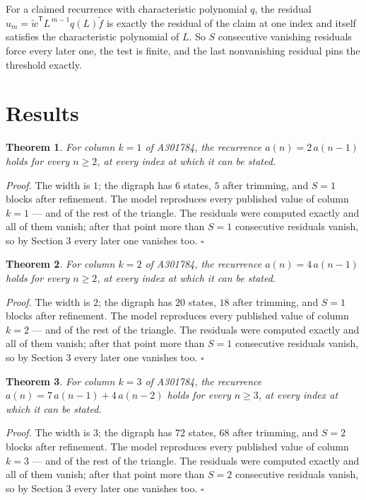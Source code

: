 \documentclass[11pt]{article}
\newtheorem{theorem}{Theorem}
\theoremstyle{definition}
\begin{document}
For a claimed recurrence with characteristic polynomial $q$, the residual $u_m = \tilde w^{\mathsf T}L^{\,m-1}q(L)\tilde f$ is exactly the residual of the claim at one index and itself satisfies the characteristic polynomial of $L$. So $S$ consecutive vanishing residuals force every later one, the test is finite, and the last nonvanishing residual pins the threshold exactly.

\section{Results}

\begin{theorem} For column $k = 1$ of A301784, the recurrence $a(n) = 2\,a(n-1)$ holds for every $n \ge 2$, at every index at which it can be stated.\end{theorem}

{\itshape Proof.} The width is $1$; the digraph has $6$ states, $5$ after trimming, and $S = 1$ blocks after refinement. The model reproduces every published value of column $k = 1$ --- and of the rest of the triangle. The residuals were computed exactly and all of them vanish; after that point more than $S = 1$ consecutive residuals vanish, so by Section 3 every later one vanishes too. $\square$

\begin{theorem} For column $k = 2$ of A301784, the recurrence $a(n) = 4\,a(n-1)$ holds for every $n \ge 2$, at every index at which it can be stated.\end{theorem}

{\itshape Proof.} The width is $2$; the digraph has $20$ states, $18$ after trimming, and $S = 1$ blocks after refinement. The model reproduces every published value of column $k = 2$ --- and of the rest of the triangle. The residuals were computed exactly and all of them vanish; after that point more than $S = 1$ consecutive residuals vanish, so by Section 3 every later one vanishes too. $\square$

\begin{theorem} For column $k = 3$ of A301784, the recurrence $a(n) = 7\,a(n-1) + 4\,a(n-2)$ holds for every $n \ge 3$, at every index at which it can be stated.\end{theorem}

{\itshape Proof.} The width is $3$; the digraph has $72$ states, $68$ after trimming, and $S = 2$ blocks after refinement. The model reproduces every published value of column $k = 3$ --- and of the rest of the triangle. The residuals were computed exactly and all of them vanish; after that point more than $S = 2$ consecutive residuals vanish, so by Section 3 every later one vanishes too. $\square$
\end{document}
